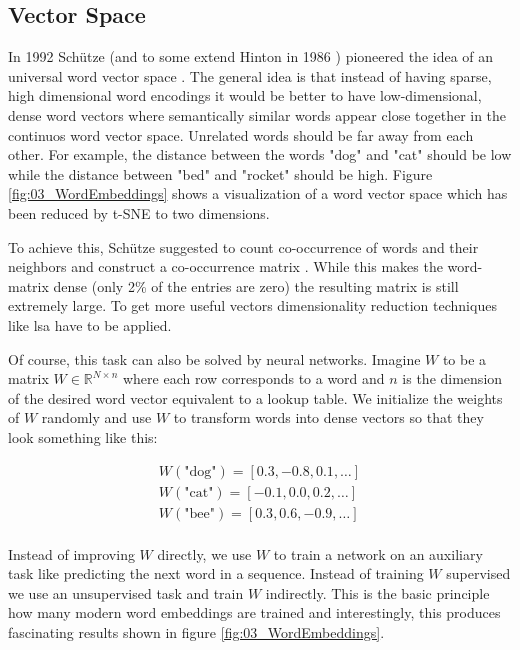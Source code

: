 \subsection{Vector Space}
\label{sec:03_vectorSpace}

In 1992 Schütze {(and to some extend Hinton in 1986 \cite{Hinton1986})} pioneered the idea of an universal word vector space \cite{Schutze1992}. The general idea is that instead of having sparse, high dimensional word encodings it would be better to have low-dimensional, dense word vectors where semantically similar words appear close together in the continuos word vector space. Unrelated words should be far away from each other. For example, the distance between the words "dog" and "cat" should be low while the distance between "bed" and "rocket" should be high. Figure \ref{fig:03_WordEmbeddings} shows a visualization of a word vector space which has been reduced by t-SNE to two dimensions.
\medskip

To achieve this, Schütze suggested to count co-occurrence of words and their neighbors and construct a co-occurrence matrix \cite{Schutze1992}. While this makes the word-matrix dense {(only 2\% of the entries are zero)} the resulting matrix is still extremely large. To get more useful vectors dimensionality reduction techniques like \gls{lsa} have to be applied.
\medskip

Of course, this task can also be solved by neural networks. Imagine $W$ to be a matrix $W \in \mathbb{R}^{N\times n}$ where each row corresponds to a word and $n$ is the dimension of the desired word vector equivalent to a lookup table. We initialize the weights of $W$ randomly and use $W$ to transform words into dense vectors so that they look something like this:

\begin{equation*}
	\begin{aligned}
		W(\text{"dog"}) = [0.3, -0.8, 0.1, \dots] \\
		W(\text{"cat"}) = [-0.1, 0.0, 0.2, \dots] \\
		W(\text{"bee"}) = [0.3, 0.6, -0.9, \dots] \\
	\end{aligned}
\end{equation*}

Instead of improving $W$ directly, we use $W$ to train a network on an auxiliary task like predicting the next word in a sequence. Instead of training $W$ supervised we use an unsupervised task and train $W$ indirectly. This is the basic principle how many modern word embeddings are trained and interestingly, this produces fascinating results shown in figure \ref{fig:03_WordEmbeddings}.
\medskip

